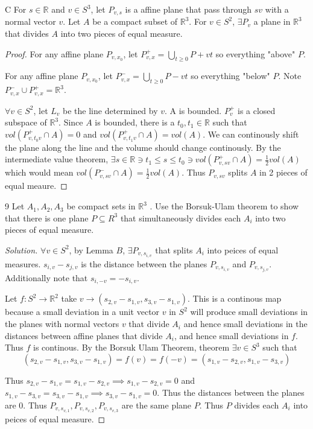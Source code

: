 \documentclass{article}
\newcommand*{\subeq}{\subseteq}
\newcommand{\R}{\mathbb{R}}
\newenvironment{solution}
{\renewcommand\qedsymbol{$\blacksquare$}\begin{proof}[Solution]}
{\end{proof}}
\begin{document}
\begin{LEM}{C}
    For $s \in \R$ and $v \in S^3$, let $P_{v, s}$ is a affine plane that pass through $sv$ with a normal vector $v$. Let $A$ be a compact subset of $\R^3$. For $v \in S^2$, $\exists P_v$ a plane in $\R^3$ that divides $A$ into two pieces of equal measure.      
\end{LEM}
\begin{proof}
    For any affine plane $P_{v, x_0}$, let $P_{v, x}^+ = \bigcup_{t \geq 0} P + vt$ so everything "above" $P$.

    For any affine plane $P_{v, x_0}$, let $P_{v, x}^- = \bigcup_{t \geq 0} P - vt$ so everything "below" $P$. Note $P_{v, x}^- \cup P_{v, x}^+ = \R^3$.  

    $\forall v \in S^2$, let $L_v$ be the line determined by $v$. A is bounded. $P_v^+$ is a closed subspace of $\R^3$. Since $A$ is bounded, there is a $t_0, t_1 \in \R$ such that $vol(P_{v, t_0v}^+ \cap A) = 0$ and $vol(P^+_{v, t_1 v} \cap A) = vol(A)$. We can continously shift the plane along the line and the volume should change continously. By the intermediate value theorem, $\exists s \in \R \ni t_1 \leq s \leq t_0 \ni vol(P_{v, sv}^+ \cap A) = \frac{1}{2} vol(A)$ which would mean $vol(P_{v, sv}^- \cap A) = \frac{1}{2} vol(A)$. Thus $P_{v, sv}$ splits $A$ in 2 pieces of equal meaure.      
\end{proof}
\begin{PROB}{9}\label{Problem 9.}
    Let $A_1, A_2, A_3$ be compact sets in $\R^3$ . Use the Borsuk-Ulam theorem to show that there is one plane $P \subeq R^3$  that simultaneously divides each $A_i$  into two pieces of equal measure.
\end{PROB}
\begin{solution}
    $\forall v \in S^2$, by Lemma $B$, $\exists P_{v, s_{i, v}}$ that splits $A_i$ into peices of equal measures. $s_{i, v} - s_{j, v}$ is the distance between the planes $P_{v, s_{i, v}}$ and $P_{v, s_{j, v}}$. Additionally note that $s_{i, -v} = - s_{i, v}$.  
    
    
    Let $f: S^2 \to \R^2$ take $v \to (s_{2, v} - s_{1, v}, s_{3, v} - s_{1, v})$. This is a continous map because a small deviation in a unit vector $v$  in $S^2$ will produce small deviations in the planes with normal vectors $v$ that divide $A_i$ and hence small deviations in the distances between affine planes that divide $A_{i}$, and hence small deviations in $f$. Thus $f$ is continous. By the Borsuk Ulam Theorem, theorem $\exists v \in S^3$ such that \[(s_{2, v} - s_{1, v}, s_{3, v} - s_{1, v}) = f(v) = f(-v) = (s_{1, v} - s_{2, v},  s_{1, v } - s_{3, v})\]

    Thus $s_{2, v} - s_{1, v} = s_{1, v} - s_{2, v}\implies s_{1, v} - s_{2, v} = 0$ and $s_{1, v } - s_{3, v} =s_{3, v} - s_{1, v} \implies s_{3, v} - s_{1, v} = 0$. Thus the distances between the planes are 0. Thus $P_{v, s_{v, 1}}, P_{v, s_{v, 2}}, P_{v, s_{v, 3}}$ are the same plane $P$. Thus $P$ divides each $A_i$ into peices of equal measure.      
\end{solution}
\end{document}

